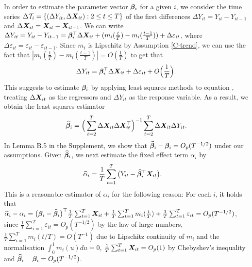\documentclass[12pt]{article}
\makeatletter
\renewcommand{\eqref}[1]{\tagform@{\ref{#1}}}
\makeatother
\begin{document}
In order to estimate the parameter vector $\bm{\beta}_i$ for a given $i$, we consider the time series $\Delta \mathcal{T}_i = \{(\Delta Y_{it}, \Delta \boldsymbol{X}_{it}): 2 \leq t \leq T\}$ of the first differences $\Delta Y_{it} = Y_{it} - Y_{i t-1}$ and $\Delta  \boldsymbol{X}_{it} =  \boldsymbol{X}_{it} - \boldsymbol{X}_{it-1}$. We can write
$\Delta Y_{it} = Y_{it} - Y_{i t-1} =\bm{\beta}_i^\top \Delta \boldsymbol{X}_{it} + (m_i (\frac{t}{T}) - m_i (\frac{t-1}{T})) + \Delta \varepsilon_{it}$,
where $ \Delta \varepsilon_{it} = \varepsilon_{it} - \varepsilon_{i t-1}$. Since $m_i$ is Lipschitz by Assumption \ref{C-trend}, we can use the fact that $ |m_i ( \frac{t}{T} ) - m_i (\frac{t-1}{T}) | = O(\frac{1}{T})$ to get that 
\begin{align}\label{model_with_regs}
\Delta Y_{it} = \bm{\beta}_i^\top \Delta \boldsymbol{X}_{it} + \Delta \varepsilon_{it} + O\Big(\frac{1}{T}\Big).
\end{align}
This suggests to estimate $\bm{\beta}_i$ by applying least squares methods to equation \eqref{model_with_regs}, treating $\Delta \boldsymbol{X}_{it}$ as the regressors and $\Delta Y_{it}$ as the response variable. As a result, we obtain the least squares estimator
\begin{align}\label{eq:beta:est}
\widehat{\bm{\beta}}_i = \Big( \sum_{t=2}^T \Delta \boldsymbol{X}_{it} \Delta \boldsymbol{X}_{it}^\top \Big)^{-1} \sum_{t=2}^T \Delta \boldsymbol{X}_{it} \Delta Y_{it}.
\end{align}
In Lemma B.5
in the Supplement, we show that $\widehat{\bm{\beta}}_i - \bm{\beta}_i = O_p(T^{-1/2})$ under our assumptions. 
Given $\widehat{\bm{\beta}}_i$, we next estimate the fixed effect term $\alpha_i$ by 
\begin{align}\label{eq:alpha:est}
\widehat{\alpha}_i &= \frac{1}{T}\sum_{t=1}^T \big(Y_{it} - \widehat{\bm{\beta}}_i^\top \boldsymbol{X}_{it}\big). 
\end{align}
This is a reasonable estimator of $\alpha_i$ for the following reason: For each $i$, it holds that
$\widehat{\alpha}_i - \alpha_i = \big(\bm{\beta}_i - \widehat{\bm{\beta}}_i \big)^\top\frac{1}{T}\sum_{t=1}^T  \boldsymbol{X}_{it} + \frac{1}{T}\sum_{t=1}^T m_i(\frac{t}{T}) + \frac{1}{T}\sum_{t=1}^T \varepsilon_{it} = O_p(T^{-1/2})$, 
since $\frac{1}{T}\sum_{i=1}^T \varepsilon_{it} = O_p(T^{-1/2})$ by the law of large numbers, $\frac{1}{T}\sum_{i=1}^T m_i(t/T) = O(T^{-1})$ due to Lipschitz continuity of $m_i$ and the normalisation $\int_{0}^1 m_i(u)du = 0$, $\frac{1}{T}\sum_{t=1}^T  \boldsymbol{X}_{it} = O_p(1)$ by Chebyshev's inequality and $\widehat{\bm{\beta}}_i - \bm{\beta}_i = O_p (T^{-1/2})$. 
\end{document}
